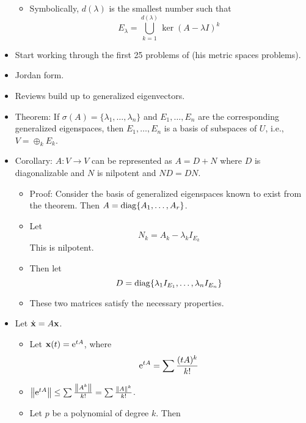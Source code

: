 \documentclass[../../notes.tex]{subfiles}
\begin{document}
\begin{itemize}
\begin{itemize}
        \item Symbolically, $d(\lambda)$ is the smallest number such that
        \begin{equation*}
            E_\lambda = \bigcup_{k=1}^{d(\lambda)}\ker(A-\lambda I)^k
        \end{equation*}
    \end{itemize}
    \item Start working through the first 25 problems of \textcite{bib:Rudin} (his metric spaces problems).
    \item {}Jordan form.
    \item Reviews build up to generalized eigenvectors.
    \item Theorem: If $\sigma(A)=\{\lambda_1,\dots,\lambda_n\}$ and $E_1,\dots,E_n$ are the corresponding generalized eigenspaces, then $E_1,\dots,E_n$ is a basis of subspaces of $U$, i.e., $V=\oplus_kE_k$.
    \item Corollary: $A:V\to V$ can be represented as $A=D+N$ where $D$ is diagonalizable and $N$ is nilpotent and $ND=DN$.
    \begin{itemize}
        \item Proof: Consider the basis of generalized eigenspaces known to exist from the theorem. Then $A=\diag\{A_1,\dots,A_r\}$.
        \item Let
        \begin{equation*}
            N_k = A_k-\lambda_kI_{E_k}
        \end{equation*}
        This is nilpotent.
        \item Then let
        \begin{equation*}
            D = \diag\{\lambda_1I_{E_1},\dots,\lambda_nI_{E_n}\}
        \end{equation*}
        \item These two matrices satisfy the necessary properties.
    \end{itemize}
    \item Let $\dot{\x}=A\x$.
    \begin{itemize}
        \item Let $\x(t)=\e[tA]$, where
        \begin{equation*}
            \e[tA] = \sum\frac{(tA)^k}{k!}
        \end{equation*}
        \item $\norm{\e[tA]}\leq\sum\frac{\norm{A^k}}{k!}=\sum\frac{\norm{A}^k}{k!}$.
        \item Let $p$ be a polynomial of degree $k$. Then

\end{itemize}
\end{itemize}
\end{document}

